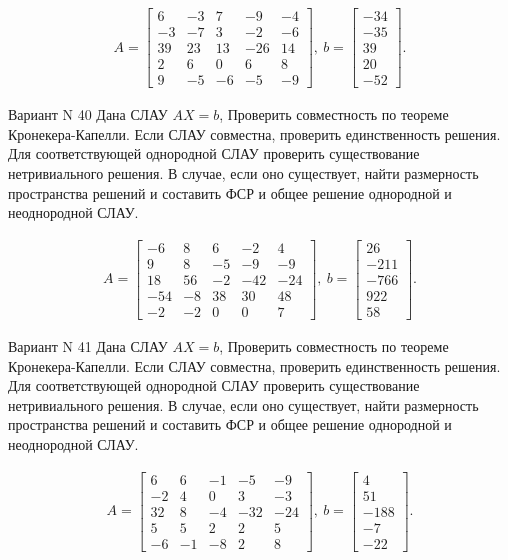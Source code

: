 \documentclass[11pt]{report}
\begin{document}
\begin{align*}
 A = \left[\begin{matrix}6 & -3 & 7 & -9 & -4\\-3 & -7 & 3 & -2 & -6\\39 & 23 & 13 & -26 & 14\\2 & 6 & 0 & 6 & 8\\9 & -5 & -6 & -5 & -9\end{matrix}\right],
\ b = \left[\begin{matrix}-34\\-35\\39\\20\\-52\end{matrix}\right]. 
 \end{align*}

Вариант N 40
Дана СЛАУ $AX = b$,
Проверить совместность по теореме Кронекера-Капелли. Если СЛАУ совместна, проверить единственность решения.
Для соответствующей однородной СЛАУ проверить существование нетривиального решения. В случае, если оно существует,
найти размерность пространства решений и составить ФСР и общее решение однородной  и неоднородной СЛАУ.


\begin{align*}
 A = \left[\begin{matrix}-6 & 8 & 6 & -2 & 4\\9 & 8 & -5 & -9 & -9\\18 & 56 & -2 & -42 & -24\\-54 & -8 & 38 & 30 & 48\\-2 & -2 & 0 & 0 & 7\end{matrix}\right],
\ b = \left[\begin{matrix}26\\-211\\-766\\922\\58\end{matrix}\right]. 
 \end{align*}

Вариант N 41
Дана СЛАУ $AX = b$,
Проверить совместность по теореме Кронекера-Капелли. Если СЛАУ совместна, проверить единственность решения.
Для соответствующей однородной СЛАУ проверить существование нетривиального решения. В случае, если оно существует,
найти размерность пространства решений и составить ФСР и общее решение однородной  и неоднородной СЛАУ.


\begin{align*}
 A = \left[\begin{matrix}6 & 6 & -1 & -5 & -9\\-2 & 4 & 0 & 3 & -3\\32 & 8 & -4 & -32 & -24\\5 & 5 & 2 & 2 & 5\\-6 & -1 & -8 & 2 & 8\end{matrix}\right],
\ b = \left[\begin{matrix}4\\51\\-188\\-7\\-22\end{matrix}\right]. 
 \end{align*}
\end{document}
